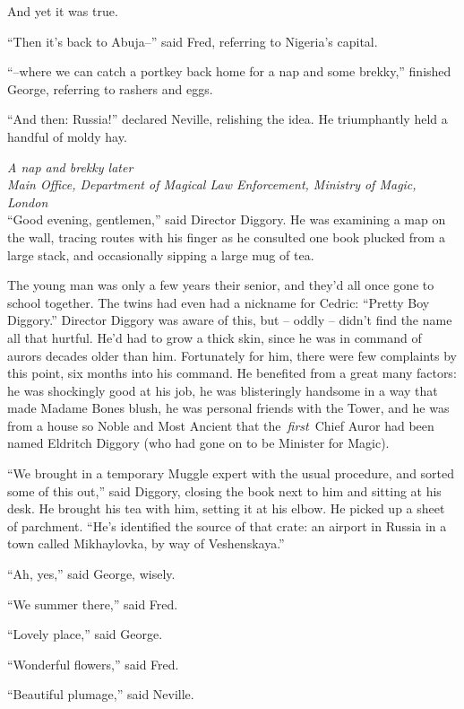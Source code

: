 And yet it was true.

``Then it's back to Abuja--'' said Fred, referring to Nigeria's capital.

``--where we can catch a portkey back home for a nap and some brekky,''
finished George, referring to rashers and eggs.

``And then: Russia!'' declared Neville, relishing the idea. He
triumphantly held a handful of moldy hay.

\mybreak

\emph{A nap and brekky later}\\
\emph{Main Office, Department of Magical Law Enforcement, Ministry of
Magic, London}\\

``Good evening, gentlemen,'' said Director Diggory. He was examining a
map on the wall, tracing routes with his finger as he consulted one book
plucked from a large stack, and occasionally sipping a large mug of tea.

The young man was only a few years their senior, and they'd all once
gone to school together. The twins had even had a nickname for Cedric:
``Pretty Boy Diggory.'' Director Diggory was aware of this, but -- oddly
-- didn't find the name all that hurtful. He'd had to grow a thick skin,
since he was in command of aurors decades older than him. Fortunately
for him, there were few complaints by this point, six months into his
command. He benefited from a great many factors: he was shockingly good
at his job, he was blisteringly handsome in a way that made Madame Bones
blush, he was personal friends with the Tower, and he was from a house
so Noble and Most Ancient that the~\emph{first}~Chief Auror had been
named Eldritch Diggory (who had gone on to be Minister for Magic).

``We brought in a temporary Muggle expert with the usual procedure, and
sorted some of this out,'' said Diggory, closing the book next to him
and sitting at his desk. He brought his tea with him, setting it at his
elbow. He picked up a sheet of parchment. ``He's identified the source
of that crate: an airport in Russia in a town called Mikhaylovka, by way
of Veshenskaya.''

``Ah, yes,'' said George, wisely.

``We summer there,'' said Fred.

``Lovely place,'' said George.

``Wonderful flowers,'' said Fred.

``Beautiful plumage,'' said Neville.


